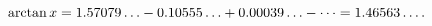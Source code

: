 \[\mathop{\mathrm{arctan}\/}\nolimits x=1.57079\ldots-0.10555\ldots+0.00039%
\ldots-\cdots=1.46563\dots.\]